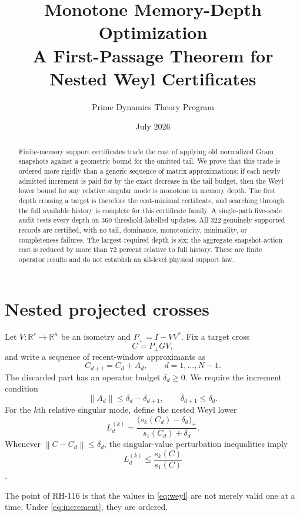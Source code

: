 \documentclass[12pt]{article}
\title{Monotone Memory-Depth Optimization\\\large A First-Passage Theorem for Nested Weyl Certificates}
\author{Prime Dynamics Theory Program}
\date{July 2026}
\newcommand{\norm}[1]{\left\lVert#1\right\rVert}
\newcommand{\R}{\mathbb{R}}
\begin{document}
\maketitle

\begin{abstract}
Finite-memory support certificates trade the cost of applying old normalized
Gram snapshots against a geometric bound for the omitted tail.  We prove
that this trade is ordered more rigidly than a generic sequence of matrix
approximations: if each newly admitted increment is paid for by the exact
decrease in the tail budget, then the Weyl lower bound for any relative
singular mode is monotone in memory depth.  The first depth crossing a target
is therefore the cost-minimal certificate, and searching through the full
available history is complete for this certificate family.  A single-path
five-scale audit tests every depth on 360 threshold-labelled updates.  All
322 genuinely supported records are certified, with no tail, dominance,
monotonicity, minimality, or completeness failures.  The largest required
depth is six; the aggregate snapshot-action cost is reduced by more than
72 percent relative to full history.  These are finite operator results and
do not establish an all-level physical support law.
\end{abstract}

\section{Nested projected crosses}
Let $V:\R^r\to\R^n$ be an isometry and $P_\perp=I-VV^*$.  Fix a target
cross
\[
 C=P_\perp G V,
\]
and write a sequence of recent-window approximants as
\[
 C_{d+1}=C_d+A_d,\qquad d=1,\ldots,N-1.
\]
The discarded part has an operator budget $\delta_d\geq0$.  We require the
increment condition
\begin{equation}\label{eq:increment}
 \norm{A_d}\leq \delta_d-\delta_{d+1},
 \qquad \delta_{d+1}\leq\delta_d.
\end{equation}
For the $k$th relative singular mode, define the nested Weyl lower
\begin{equation}\label{eq:weyl}
 L_d^{(k)}=
 \frac{\bigl(s_k(C_d)-\delta_d\bigr)_+}
 {s_1(C_d)+\delta_d}.
\end{equation}
Whenever $\norm{C-C_d}\leq\delta_d$, the singular-value perturbation
inequalities imply
\[
 L_d^{(k)}\leq \frac{s_k(C)}{s_1(C)}
\]
\citep{HornJohnson1991}.

The point of RH-116 is that the values in \eqref{eq:weyl} are not merely
valid one at a time.  Under \eqref{eq:increment}, they are ordered.
\end{document}
